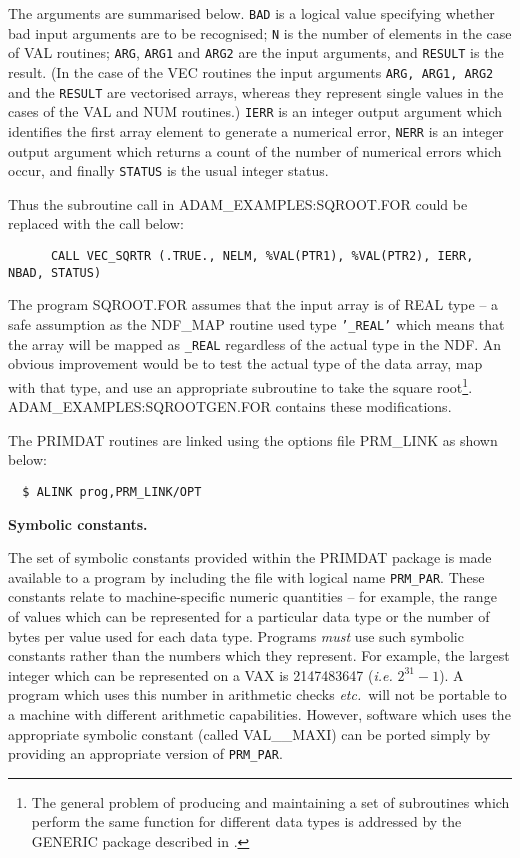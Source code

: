 The arguments are summarised below. 
{\tt BAD} is a logical value specifying whether 
bad input arguments are to be recognised;
{\tt N} is the number of elements in the case of VAL routines;
{\tt ARG}, {\tt ARG1} and {\tt ARG2} are the input
arguments, and {\tt RESULT} is the result.
(In the case of the VEC routines the input 
arguments {\tt ARG, ARG1, ARG2}  and the {\tt RESULT}  are vectorised arrays, 
whereas they represent  single values in the cases of the VAL and NUM 
routines.)
{\tt IERR} is an integer output argument which identifies the
first array element to generate a numerical error,
{\tt NERR} is an integer output argument which returns a count of the
number of numerical errors which occur,
and finally {\tt STATUS} is the usual integer status.

Thus the subroutine call in ADAM\_EXAMPLES:SQROOT.FOR could be
replaced with the call below:
{\small
\begin{verbatim}
      CALL VEC_SQRTR (.TRUE., NELM, %VAL(PTR1), %VAL(PTR2), IERR, NBAD, STATUS)
\end{verbatim}}
The program SQROOT.FOR assumes that the input array is of
REAL type -- a safe assumption as
the NDF\_MAP routine used type {\tt'\_REAL'} which means that the array 
will be mapped as {\tt\_REAL} regardless of the actual type in the NDF.
An obvious improvement would be to test the actual type of the data array,
map with that type, and
use an appropriate subroutine to take the square 
root\footnote{The general problem of producing and maintaining 
a set of subroutines which perform the same function for different 
data types is addressed by  the GENERIC package described in
.}.
ADAM\_EXAMPLES:SQROOTGEN.FOR contains these modifications.

The PRIMDAT routines are linked using the options file PRM\_LINK as shown 
below:
\begin{verbatim}
  $ ALINK prog,PRM_LINK/OPT
\end{verbatim}

{\bigskip\large\bf Symbolic constants.}

The  set of symbolic constants provided within the PRIMDAT package is 
made available to a program by including the file with logical name 
{\tt PRM\_PAR}. 
These constants relate to machine-specific numeric quantities -- for 
example, the
range of values which can be represented for a particular data type or 
the number of bytes per value used for each data type.
Programs {\sl must\/}  use such symbolic constants  rather than 
the numbers which they represent.
For example, the largest integer which can be represented on a VAX is
2147483647 ({\it i.e.} $2^{31}-1$).
A program which uses this number in arithmetic checks 
{\it etc.}\ will not be portable to a machine with different arithmetic capabilities.
However, software which uses the appropriate symbolic constant  (called 
VAL\_\_MAXI) can
be  ported  simply by providing an appropriate version of {\tt PRM\_PAR}.


